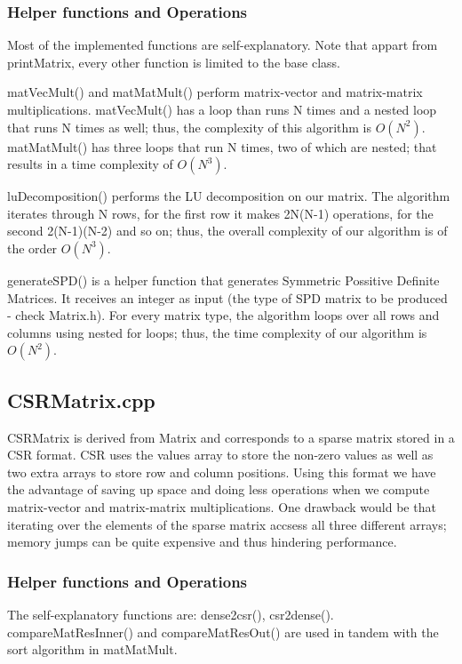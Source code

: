 \documentclass[11pt]{article}
\begin{document}
\subsubsection{Helper functions and Operations}
\label{sec:org4e0edcb}
Most of the implemented functions are self-explanatory. Note that appart from
printMatrix, every other function is limited to the base class.

matVecMult() and matMatMult() perform matrix-vector and matrix-matrix
multiplications. matVecMult() has a loop than runs N
times and a nested loop that runs N times as well; thus, the complexity of this
algorithm is \(O(N^2)\). matMatMult() has three loops that run N times, two of
which are nested; that results in a time complexity of \(O(N^3)\).

luDecomposition() performs the LU decomposition on our matrix. The algorithm
iterates through N rows, for the first row it makes 2N(N-1) operations, for the
second 2(N-1)(N-2) and so on; thus, the overall complexity of our algorithm is
of the order \(O(N^3)\).

generateSPD() is a helper function that generates Symmetric Possitive Definite
Matrices. It receives an integer as input (the type of SPD matrix to
be produced - check Matrix.h). For every matrix type, the algorithm loops over
all rows and columns using nested for loops; thus, the time complexity of our
algorithm is \(O(N^2)\).

\subsection{CSRMatrix.cpp}
\label{sec:org1e0138d}
CSRMatrix is derived from Matrix and corresponds to a sparse matrix stored in a
CSR format. CSR uses the values array to store the non-zero values as well as
two extra arrays to store row and column positions. Using this format we
have the advantage of saving up space and doing less operations when we compute
matrix-vector and matrix-matrix multiplications. One drawback would be that
iterating over the elements of the sparse matrix accsess all three different
arrays; memory jumps can be quite expensive and thus hindering performance.

\subsubsection{Helper functions and Operations}
\label{sec:org7b4e64c}
The self-explanatory functions are: dense2csr(), csr2dense(). 
compareMatResInner() and compareMatResOut() are used in tandem with the sort algorithm in matMatMult.
\end{document}
